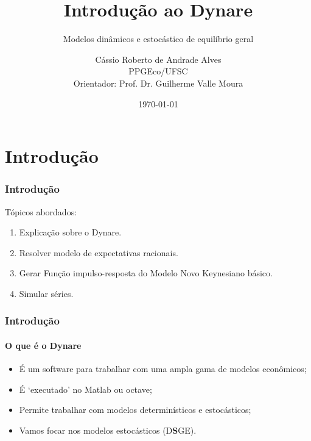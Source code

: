 \documentclass[xcolor=pdftex,dvipsnames,table]{beamer}
\title[Dynare]{Introdução ao Dynare} \subtitle{Modelos dinâmicos e estocástico de equilíbrio geral}
\author[Alves, C. A.]
{
Cássio Roberto de Andrade Alves\\
PPGEco/UFSC \\
Orientador: Prof. Dr. Guilherme Valle Moura
}
\date{\today}
\newcommand{\ft}{\frametitle}
\begin{document}
\frame[plain]{\titlepage \setcounter{framenumber}{0}}

\section{Introdução}

\begin{frame}
\ft{Introdução}

Tópicos abordados:

\begin{enumerate}
\item Explicação sobre o Dynare.
\item Resolver modelo de expectativas racionais.
\item Gerar Função impulso-resposta do Modelo Novo Keynesiano básico.
\item Simular séries.
\end{enumerate}

\end{frame}


\begin{frame}
\ft{Introdução}
\framesubtitle{O que é o Dynare}

	\begin{itemize}
	\item É um software para trabalhar com uma ampla gama de modelos econômicos;
	
	\item É `executado' no Matlab ou octave;
	
	\item Permite trabalhar com modelos determinísticos e estocásticos;

	\item Vamos focar nos modelos estocásticos (D\textbf{S}GE).
	\end{itemize}

\end{frame}
\end{document}
